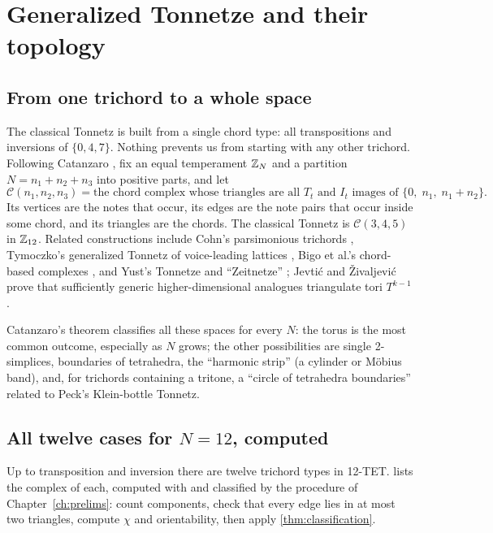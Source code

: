 \chapter{Generalized Tonnetze and their topology}\label{ch:topology}

\section{From one trichord to a whole space}\label{sec:gentonnetz}
The classical Tonnetz is built from a single chord type: all transpositions and inversions of $\{0,4,7\}$. Nothing
prevents us from starting with any other trichord. Following Catanzaro \citep{catanzaro2011}, fix an equal
temperament $\mathbb{Z}_N$ and a partition $N=n_1+n_2+n_3$ into positive parts, and let
\[
\mathcal C(n_1,n_2,n_3)=\text{the chord complex whose triangles are all } T_t\text{ and } I_t\text{ images of }
\{0,\;n_1,\;n_1+n_2\}.
\]
Its vertices are the notes that occur, its edges are the note pairs that occur inside some chord, and its triangles
are the chords. The classical Tonnetz is $\mathcal C(3,4,5)$ in $\mathbb{Z}_{12}$. Related constructions include Cohn's
parsimonious trichords \citep{cohn1997}, Tymoczko's generalized Tonnetz of voice-leading lattices
\citep{tymoczko2012}, Bigo et al.'s chord-based complexes \citep{bigo2013}, and Yust's Tonnetze and ``Zeitnetze''
\citep{yust2020}; Jevti\'c and \v{Z}ivaljevi\'c prove that sufficiently generic higher-dimensional analogues
triangulate tori $T^{k-1}$ \citep{jevtic2021}.

Catanzaro's theorem \citep{catanzaro2011} classifies all these spaces for every $N$: the torus is the most common
outcome, especially as $N$ grows; the other possibilities are single 2-simplices, boundaries of tetrahedra, the
``harmonic strip'' (a cylinder or M\"obius band), and, for trichords containing a tritone, a ``circle of
tetrahedra boundaries'' related to Peck's Klein-bottle Tonnetz.

\section{All twelve cases for $N=12$, computed}
Up to transposition and inversion there are twelve trichord types in 12-TET.  lists the
complex of each, computed with  and classified by the procedure of
Chapter~\ref{ch:prelims}: count components, check that every edge lies in at most two triangles, compute $\chi$
and orientability, then apply \cref{thm:classification}.

